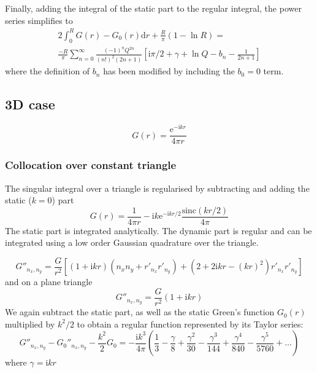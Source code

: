\documentclass[a4paper,11pt]{article}
\newcommand{\td}{\mathrm{d}}
\newcommand{\te}{\mathrm{e}}
\newcommand{\ti}{\mathrm{i}}
\newcommand{\sinc}{\mathrm{sinc}}
\begin{document}
Finally, adding the integral of the static part to the regular integral, the power series simplifies to
%
\begin{multline}
2\int_{0}^{R} G(r)-G_0(r) \td r + \frac{R}{\pi}\left(1-\ln R\right)
= \\
\frac{-R}{\pi} 
\sum_{n=0}^{\infty}
\frac{(-1)^n Q^{2n}}{\left(n!\right)^2\left(2n+1\right)}
\left[\ti\pi/2 + \gamma + \ln Q - b_n - \frac{1}{2n + 1}\right]
\end{multline}
%
where the definition of $b_n$ has been modified by including the $b_0 = 0$ term.


\subsection{3D case}

\begin{equation}
G(r) = \frac{\te^{-\ti k r}}{4\pi r}
\end{equation}

\subsubsection{Collocation over constant triangle}

The singular integral over a triangle is regularised by subtracting and adding the static ($k = 0$) part
%
\begin{equation}
G(r) = \frac{1}{4\pi r} -\ti k \te^{-\ti k r/2} \frac{\sinc(k r/2)}{4\pi}
\end{equation}
%
The static part is integrated analytically.
The dynamic part is regular and can be integrated using a low order Gaussian quadrature over the triangle.


\begin{equation}
G''_{n_x, n_y} = \frac{G}{r^2} \left[ 
\left(1+\ti k r\right)\left(n_x n_y + r'_{n_x} r'_{n_y}\right) 
 + \left(2 + 2 \ti k r - (kr)^2\right) r'_{n_x} r'_{n_y}
\right]
\end{equation}
%
and on a plane triangle
%
\begin{equation}
G''_{n_x, n_y} = \frac{G}{r^2} \left(1+\ti k r\right)
\end{equation}
%
We again subtract the static part, as well as the static Green's function $G_0(r)$ multiplied by $k^2/2$ to obtain a regular function represented by its Taylor series:
%
\begin{equation}
G''_{n_x, n_y} - {G_0}''_{n_x, n_y} - \frac{k^2}{2} G_0 =
-\frac{\ti k^3}{4\pi}
\left(
\frac{1}{3}
- \frac\gamma{8} 
+ \frac{\gamma^2}{30} 
- \frac{\gamma^3}{144} 
+ \frac{\gamma^4}{840} 
-\frac{\gamma^5}{5760} 
+\dots
\right)
\end{equation}
%
where $\gamma = \ti k r$
\end{document}
